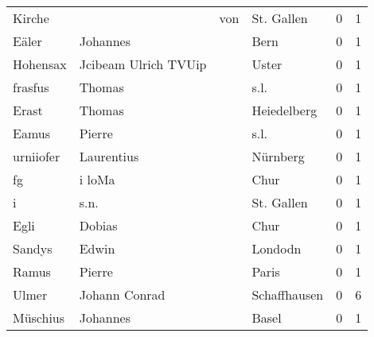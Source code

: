 \begin{center}
\begin{tiny}
\begin{longtabu}{llllrr}
                   Kirche &                                    &         von &                                  St. Gallen &          0 &         1 \\
                    Eäler &                           Johannes &             &                                        Bern &          0 &         1 \\
                 Hohensax &               Jcibeam Ulrich TVUip &             &                                       Uster &          0 &         1 \\
                  frasfus &                             Thomas &             &                                        s.l. &          0 &         1 \\
                    Erast &                             Thomas &             &                                 Heiedelberg &          0 &         1 \\
                    Eamus &                             Pierre &             &                                        s.l. &          0 &         1 \\
                urniiofer &                         Laurentius &             &                                    Nürnberg &          0 &         1 \\
                       fg &                             i loMa &             &                                        Chur &          0 &         1 \\
                        i &                               s.n. &             &                                  St. Gallen &          0 &         1 \\
                     Egli &                             Dobias &             &                                        Chur &          0 &         1 \\
                   Sandys &                              Edwin &             &                                     Londodn &          0 &         1 \\
                    Ramus &                             Pierre &             &                                       Paris &          0 &         1 \\
                    Ulmer &                      Johann Conrad &             &                                Schaffhausen &          0 &         6 \\
                 Müschius &                           Johannes &             &                                       Basel &          0 &         1 \\

\end{longtabu}
\end{tiny}
\end{center}
